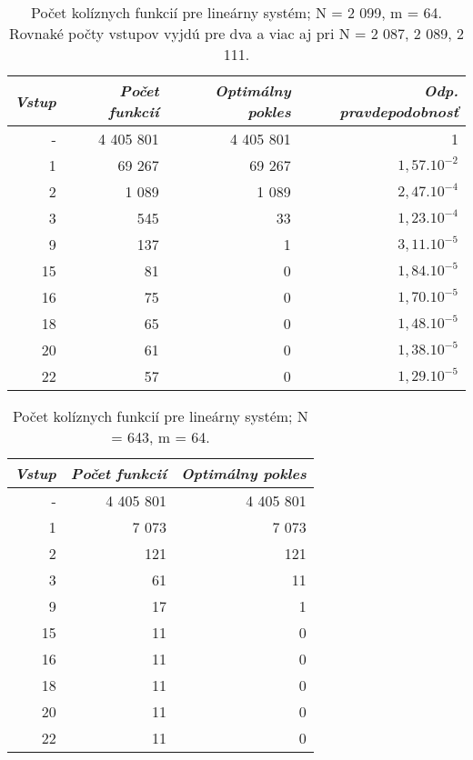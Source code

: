\begin{table}
	\begin{center}
		\begin{tabular}{r r r r}
			\toprule[1pt]
			\emph{Vstup} & \emph{Počet funkcií} & \emph{Optimálny pokles} & \emph{Odp. pravdepodobnosť} \\
			\midrule[0.7pt]
			- &		4 405 801 &	4 405 801 &	1 \\
			\hline
			1 &		69 267 & 	69 267 &	$1,57.10^{-2}$ \\
			\hline
			2 &		1 089 & 	1 089 & 	$2,47.10^{-4}$ \\
			\hline
			3 &		545 & 		33 & 		$1,23.10^{-4}$ \\
			\hline
			9 &		137 & 		1 & 		$3,11.10^{-5}$ \\
			\hline
			15 &	81 & 		0 & 		$1,84.10^{-5}$ \\
			\hline
			16 &	75 & 		0 & 		$1,70.10^{-5}$ \\
			\hline
			18 &	65 & 		0 & 		$1,48.10^{-5}$ \\
			\hline
			20 &	61 & 		0 & 		$1,38.10^{-5}$ \\
			\hline
			22 &	57 & 		0 & 		$1,29.10^{-5}$ \\
			\bottomrule[1pt]
		\end{tabular}
	\end{center}

	\caption{Počet kolíznych funkcií pre lineárny systém; N = 2 099, m = 64. Rovnaké počty vstupov vyjdú pre dva a viac aj pri N = 2 087, 2 089, 2 111.}
	\label{tries:cwlf-experimental-probability-2099-64}
\end{table}

\begin{table}
	\begin{center}
		\begin{tabular}{r r r}
			\toprule[1pt]
			\emph{Vstup} & \emph{Počet funkcií} & \emph{Optimálny pokles} \\
			\midrule[0.7pt]
			- &		4 405 801 &	4 405 801 \\
			\hline
			1 &		7 073 & 	7 073 \\
			\hline
			2 &		121 & 		121 \\
			\hline
			3 &		61 & 		11 \\
			\hline
			9 &		17 & 		1 \\
			\hline
			15 &	11 & 		0 \\
			\hline
			16 &	11 & 		0 \\
			\hline
			18 &	11 & 		0 \\
			\hline
			20 &	11 & 		0 \\
			\hline
			22 &	11 & 		0 \\
			\bottomrule[1pt]
		\end{tabular}
	\end{center}

	\caption{Počet kolíznych funkcií pre lineárny systém; N = 643, m = 64.}
	\label{tries:cwlf-experimental-probability-643-64}
\end{table}

